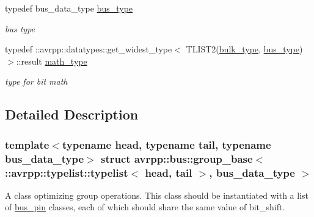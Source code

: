 \begin{DoxyCompactItemize}
typedef bus\_\-data\_\-type \hyperlink{structavrpp_1_1bus_1_1group__base_3_01_1_1avrpp_1_1typelist_1_1typelist_3_01head_00_01tail_01_4_00_01bus__data__type_01_4_a6bb1dd5bee9245aaace9d610a03fa8f9}{bus\_\-type}
\begin{DoxyCompactList}\small\item\em bus type \item\end{DoxyCompactList}\item 
typedef ::avrpp::datatypes::get\_\-widest\_\-type$<$ TLIST2(\hyperlink{structavrpp_1_1bus_1_1group__base_3_01_1_1avrpp_1_1typelist_1_1typelist_3_01head_00_01tail_01_4_00_01bus__data__type_01_4_aabf304c3e2b2801e376ef2bf62a2062a}{bulk\_\-type}, \hyperlink{structavrpp_1_1bus_1_1group__base_3_01_1_1avrpp_1_1typelist_1_1typelist_3_01head_00_01tail_01_4_00_01bus__data__type_01_4_a6bb1dd5bee9245aaace9d610a03fa8f9}{bus\_\-type}) $>$::result \hyperlink{structavrpp_1_1bus_1_1group__base_3_01_1_1avrpp_1_1typelist_1_1typelist_3_01head_00_01tail_01_4_00_01bus__data__type_01_4_a1b71ab19a4efd082314f453d54061651}{math\_\-type}
\begin{DoxyCompactList}\small\item\em type for bit math \item\end{DoxyCompactList}\end{DoxyCompactItemize}


\subsection{Detailed Description}
\subsubsection*{template$<$typename head, typename tail, typename bus\_\-data\_\-type$>$ struct avrpp::bus::group\_\-base$<$ ::avrpp::typelist::typelist$<$ head, tail $>$, bus\_\-data\_\-type $>$}

A class optimizing group operations. This class should be instantiated with a list of \hyperlink{structavrpp_1_1bus_1_1bus__pin}{bus\_\-pin} classes, each of which should share the same value of bit\_\-shift. 

